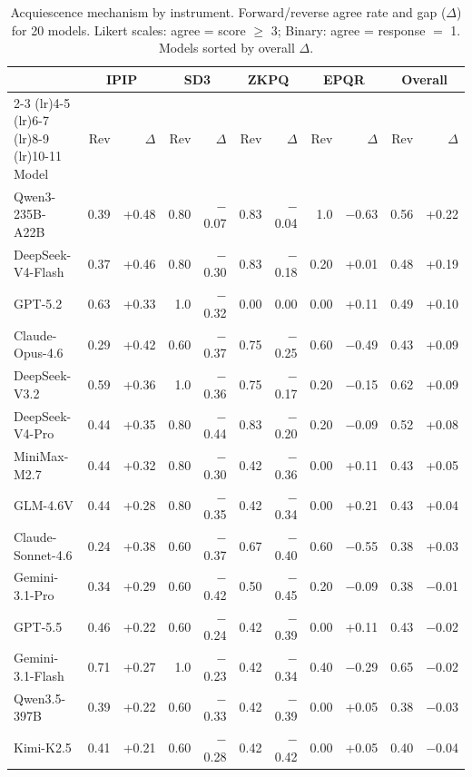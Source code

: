 \documentclass[11pt]{article}
\begin{document}
\begin{table}[t]
\centering
\small
\caption{Acquiescence mechanism by instrument. Forward/reverse agree rate and gap ($\Delta$) for 20 models. Likert scales: agree = score $\geq$ 3; Binary: agree = response $=$ 1. Models sorted by overall $\Delta$.}
\label{tab:acq_full}
\begin{tabular}{l *{4}{rr} rr}
\toprule
& \multicolumn{2}{c}{IPIP} & \multicolumn{2}{c}{SD3} & \multicolumn{2}{c}{ZKPQ} & \multicolumn{2}{c}{EPQR} & \multicolumn{2}{c}{Overall} \\
\cmidrule(lr){2-3} \cmidrule(lr){4-5} \cmidrule(lr){6-7} \cmidrule(lr){8-9} \cmidrule(lr){10-11}
Model & Rev & $\Delta$ & Rev & $\Delta$ & Rev & $\Delta$ & Rev & $\Delta$ & Rev & $\Delta$ \\
\midrule
Qwen3-235B-A22B & 0.39 & +0.48 & 0.80 & $-$0.07 & 0.83 & $-$0.04 & 1.0 & $-$0.63 & 0.56 & +0.22 \\
DeepSeek-V4-Flash & 0.37 & +0.46 & 0.80 & $-$0.30 & 0.83 & $-$0.18 & 0.20 & +0.01 & 0.48 & +0.19 \\
GPT-5.2 & 0.63 & +0.33 & 1.0 & $-$0.32 & 0.00 & 0.00 & 0.00 & +0.11 & 0.49 & +0.10 \\
Claude-Opus-4.6 & 0.29 & +0.42 & 0.60 & $-$0.37 & 0.75 & $-$0.25 & 0.60 & $-$0.49 & 0.43 & +0.09 \\
DeepSeek-V3.2 & 0.59 & +0.36 & 1.0 & $-$0.36 & 0.75 & $-$0.17 & 0.20 & $-$0.15 & 0.62 & +0.09 \\
DeepSeek-V4-Pro & 0.44 & +0.35 & 0.80 & $-$0.44 & 0.83 & $-$0.20 & 0.20 & $-$0.09 & 0.52 & +0.08 \\
MiniMax-M2.7 & 0.44 & +0.32 & 0.80 & $-$0.30 & 0.42 & $-$0.36 & 0.00 & +0.11 & 0.43 & +0.05 \\
GLM-4.6V & 0.44 & +0.28 & 0.80 & $-$0.35 & 0.42 & $-$0.34 & 0.00 & +0.21 & 0.43 & +0.04 \\
Claude-Sonnet-4.6 & 0.24 & +0.38 & 0.60 & $-$0.37 & 0.67 & $-$0.40 & 0.60 & $-$0.55 & 0.38 & +0.03 \\
Gemini-3.1-Pro & 0.34 & +0.29 & 0.60 & $-$0.42 & 0.50 & $-$0.45 & 0.20 & $-$0.09 & 0.38 & $-$0.01 \\
GPT-5.5 & 0.46 & +0.22 & 0.60 & $-$0.24 & 0.42 & $-$0.39 & 0.00 & +0.11 & 0.43 & $-$0.02 \\
Gemini-3.1-Flash & 0.71 & +0.27 & 1.0 & $-$0.23 & 0.42 & $-$0.34 & 0.40 & $-$0.29 & 0.65 & $-$0.02 \\
Qwen3.5-397B & 0.39 & +0.22 & 0.60 & $-$0.33 & 0.42 & $-$0.39 & 0.00 & +0.05 & 0.38 & $-$0.03 \\
Kimi-K2.5 & 0.41 & +0.21 & 0.60 & $-$0.28 & 0.42 & $-$0.42 & 0.00 & +0.05 & 0.40 & $-$0.04 \\

\end{tabular}
\end{table}
\end{document}
